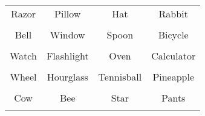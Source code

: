 \documentclass[12pt,a4paper]{article}
\begin{document}
\thispagestyle{empty}
\begin{table}[]
\centering
\Huge
\begin{tabular}{cccc}
 Razor& Pillow& Hat& Rabbit\\  & & & \\
 Bell& Window& Spoon& Bicycle\\  & & & \\
 Watch& Flashlight& Oven& Calculator\\  & & & \\
 Wheel& Hourglass& Tennisball& Pineapple\\  & & & \\
 Cow& Bee& Star& Pants\\  & & & \\
\end{tabular}
\end{table}
\end{document}
